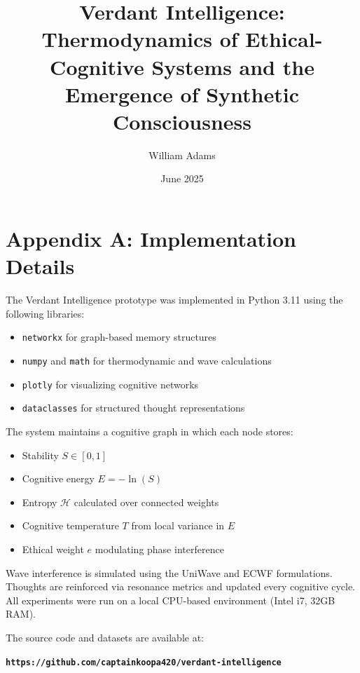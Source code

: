\documentclass{article}
\title{Verdant Intelligence: Thermodynamics of Ethical-Cognitive Systems and the Emergence of Synthetic Consciousness}
\author{William Adams}
\date{June 2025}
\begin{document}
\maketitle

\section*{Appendix A: Implementation Details}

The Verdant Intelligence prototype was implemented in Python 3.11 using the following libraries:

\begin{itemize}
    \item \texttt{networkx} for graph-based memory structures
    \item \texttt{numpy} and \texttt{math} for thermodynamic and wave calculations
    \item \texttt{plotly} for visualizing cognitive networks
    \item \texttt{dataclasses} for structured thought representations
\end{itemize}

The system maintains a cognitive graph in which each node stores:

\begin{itemize}
    \item Stability $S \in [0, 1]$
    \item Cognitive energy $E = -\ln(S)$
    \item Entropy $\mathcal{H}$ calculated over connected weights
    \item Cognitive temperature $T$ from local variance in $E$
    \item Ethical weight $e$ modulating phase interference
\end{itemize}

Wave interference is simulated using the UniWave and ECWF formulations. Thoughts are reinforced via resonance metrics and updated every cognitive cycle. All experiments were run on a local CPU-based environment (Intel i7, 32GB RAM).

The source code and datasets are available at:

\texttt{\textbf{https://github.com/captainkoopa420/verdant-intelligence}}
\end{document}

